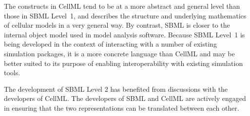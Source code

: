 \documentclass[10pt,twocolumntoc]{cekarticle}
\begin{document}
The constructs in CellML tend to be at a more abstract and general level
than those in SBML Level~1, and describes the structure and underlying
mathematics of cellular models in a very general way.  By contrast, SBML is
closer to the internal object model used in model analysis software.
Because SBML Level~1 is being developed in the context of interacting with
a number of existing simulation packages, it is a more concrete language
than CellML and may be better suited to its purpose of enabling
interoperability with existing simulation tools.

The development of SBML Level 2 has benefited from discussions with the
developers of CellML.  The developers of SBML and CellML are actively
engaged in ensuring that the two representations can be translated between
each other.






\end{document}

